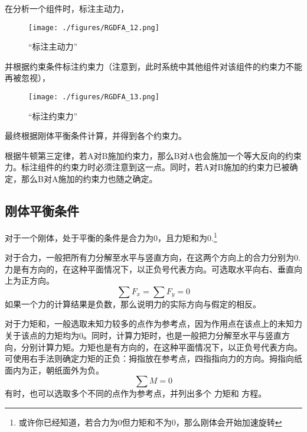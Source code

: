 在分析一个组件时，标注主动力，
\begin{figure}[ht]
\centering
\texttt{[image: ./figures/RGDFA\_12.png]}
\caption{“标注主动力”} \label{RGDFA_fig12}
\end{figure}
并根据约束条件标注约束力（注意到，此时系统中其他组件对该组件的约束力不能再被忽视），
\begin{figure}[ht]
\centering
\texttt{[image: ./figures/RGDFA\_13.png]}
\caption{“标注约束力”} \label{RGDFA_fig13}
\end{figure}
最终根据刚体平衡条件计算，并得到各个约束力。

根据牛顿第三定律，若A对B施加约束力，那么B对A也会施加一个等大反向的约束力。标注组件的约束力时必须注意到这一点。同时，若A对B施加的约束力已被确定，那么B对A施加的约束力也随之确定。

\subsection{刚体平衡条件}\label{RGDFA_sub1}
对于一个刚体，处于平衡的条件是合力为0，且力矩和为0.\footnote{或许你已经知道，若合力为0但力矩和不为0，那么刚体会开始加速旋转}

对于合力，一般把所有力分解至水平与竖直方向，在这两个方向上的合力分别为0. 力是有方向的，在这种平面情况下，以正负号代表方向。可选取水平向右、垂直向上为正方向。
\begin{equation}
\sum F_x=\sum F_y=0
\end{equation}
如果一个力的计算结果是负数，那么说明力的实际方向与假定的相反。

对于力矩和，一般选取未知力较多的点作为参考点，因为作用点在该点上的未知力关于该点的力矩均为0。同时，计算力矩时，也是一般把力分解至水平与竖直方向，分别计算力矩。力矩也是有方向的，在这种平面情况下，以正负号代表方向。可使用右手法则确定力矩的正负：拇指放在参考点，四指指向力的方向。拇指向纸面内为正，朝纸面外为负。
\begin{equation}
\sum M=0
\end{equation}
有时，也可以选取多个不同的点作为参考点，并列出多个 力矩和 方程。

